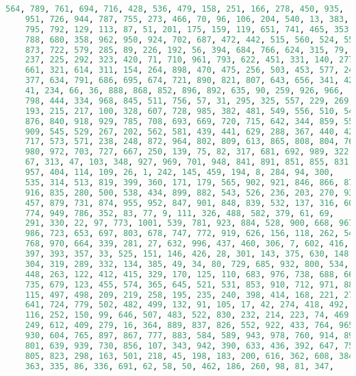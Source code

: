 \documentclass[a4paper, 12pt]{article}
\theoremstyle{definition}
\begin{document}
\begin{lstlisting}[language=Python]
    564, 789, 761, 694, 716, 428, 536, 479, 158, 251, 166, 278, 450, 935,
    951, 726, 944, 787, 755, 273, 466, 70, 96, 106, 204, 540, 13, 383,
    795, 792, 129, 113, 87, 51, 201, 175, 159, 119, 651, 741, 465, 353,
    788, 680, 358, 962, 950, 924, 702, 687, 472, 442, 515, 560, 524, 551,
    873, 722, 579, 285, 89, 226, 192, 56, 394, 684, 766, 624, 315, 79,
    237, 225, 292, 323, 420, 71, 710, 961, 793, 622, 451, 331, 140, 277,
    661, 321, 614, 311, 154, 264, 898, 470, 475, 256, 503, 453, 577, 246,
    377, 634, 791, 686, 695, 674, 721, 890, 821, 807, 643, 656, 341, 425,
    41, 234, 66, 36, 888, 868, 852, 896, 892, 635, 90, 259, 926, 966,
    798, 444, 334, 968, 845, 511, 756, 57, 31, 295, 325, 557, 229, 269,
    193, 215, 217, 100, 328, 607, 728, 985, 382, 481, 549, 556, 510, 547,
    876, 840, 918, 929, 785, 708, 693, 669, 720, 715, 642, 344, 859, 553,
    909, 545, 529, 267, 202, 562, 581, 439, 441, 629, 288, 367, 440, 429,
    717, 573, 571, 238, 248, 872, 964, 802, 809, 613, 865, 808, 804, 769,
    980, 972, 703, 727, 667, 250, 139, 75, 82, 317, 681, 692, 989, 322,
    67, 313, 47, 103, 348, 927, 969, 701, 948, 841, 891, 851, 855, 831,
    957, 404, 114, 109, 26, 1, 242, 145, 459, 194, 8, 284, 94, 300,
    535, 314, 513, 819, 399, 360, 171, 179, 565, 902, 921, 846, 866, 877,
    916, 835, 280, 500, 538, 434, 899, 882, 543, 526, 236, 203, 270, 93,
    457, 879, 731, 874, 955, 952, 847, 901, 848, 839, 532, 137, 316, 600,
    774, 949, 786, 352, 83, 77, 9, 111, 326, 488, 582, 379, 61, 69,
    291, 330, 22, 97, 773, 1001, 539, 781, 923, 884, 528, 900, 668, 967,
    986, 723, 653, 697, 803, 678, 747, 772, 919, 626, 156, 118, 262, 546,
    768, 970, 664, 339, 281, 27, 632, 996, 437, 460, 306, 7, 602, 416,
    397, 393, 357, 33, 525, 151, 146, 426, 28, 301, 143, 375, 630, 148,
    304, 319, 289, 332, 134, 385, 49, 34, 80, 729, 685, 932, 800, 534,
    448, 263, 122, 412, 415, 329, 170, 125, 110, 683, 976, 738, 688, 665,
    735, 679, 123, 455, 574, 365, 645, 521, 531, 853, 910, 712, 971, 88,
    115, 497, 498, 209, 219, 258, 195, 235, 240, 398, 414, 168, 221, 271,
    641, 724, 779, 502, 482, 499, 132, 91, 105, 17, 42, 274, 418, 492,
    116, 252, 150, 99, 646, 507, 483, 522, 830, 232, 214, 223, 74, 469,
    249, 612, 409, 279, 16, 364, 889, 837, 826, 552, 922, 433, 764, 965,
    930, 604, 765, 897, 867, 777, 883, 584, 589, 943, 978, 760, 914, 895,
    801, 639, 939, 730, 856, 107, 343, 942, 390, 633, 436, 392, 647, 757,
    805, 823, 298, 163, 501, 218, 45, 198, 183, 200, 616, 362, 608, 384,
    363, 335, 86, 336, 691, 62, 58, 50, 462, 186, 260, 98, 81, 347,

\end{lstlisting}
\end{document}

